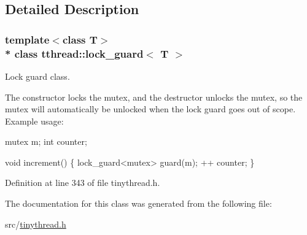 \subsection{Detailed Description}
\subsubsection*{template$<$class T$>$\\*
class tthread\+::lock\+\_\+guard$<$ T $>$}

Lock guard class. 

The constructor locks the mutex, and the destructor unlocks the mutex, so the mutex will automatically be unlocked when the lock guard goes out of scope. Example usage\+: 
\begin{DoxyCode}
mutex m;
\textcolor{keywordtype}{int} counter;

\textcolor{keywordtype}{void} increment()
\{
  lock\_guard<mutex> guard(m);
  ++ counter;
\}
\end{DoxyCode}
 

Definition at line 343 of file tinythread.\+h.



The documentation for this class was generated from the following file\+:\begin{DoxyCompactItemize}
\item 
src/\hyperlink{tinythread_8h}{tinythread.\+h}\end{DoxyCompactItemize}

